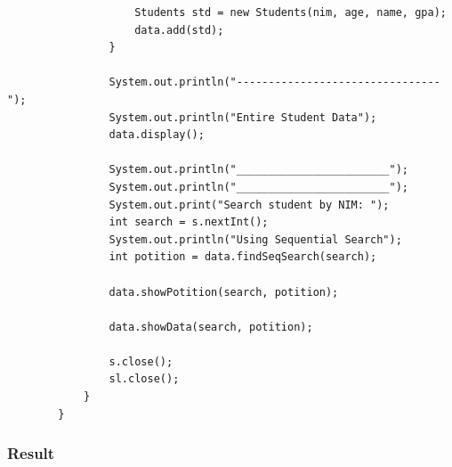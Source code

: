 \documentclass[12pt,titlepage]{article}
\begin{document}
\begin{enumerate}
\begin{verbatim}
                    Students std = new Students(nim, age, name, gpa);
                    data.add(std);
                }

                System.out.println("--------------------------------");
                System.out.println("Entire Student Data");
                data.display();

                System.out.println("________________________");
                System.out.println("________________________");
                System.out.print("Search student by NIM: ");
                int search = s.nextInt();
                System.out.println("Using Sequential Search");
                int potition = data.findSeqSearch(search);

                data.showPotition(search, potition);

                data.showData(search, potition);

                s.close();
                sl.close();
            }
        }
    \end{verbatim}
\end{enumerate}

\subsubsection{Result}
\end{document}
